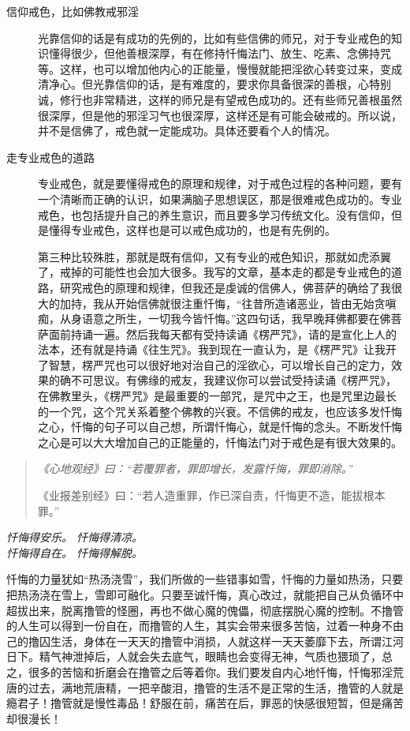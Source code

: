 \documentclass{ctexart}
\begin{document}
\begin{description}
    \item[信仰戒色，比如佛教戒邪淫] 光靠信仰的话是有成功的先例的，比如有些信佛的师兄，对于专业戒色的知识懂得很少，但他善根深厚，有在修持忏悔法门、放生、吃素、念佛持咒等。这样，也可以增加他内心的正能量，慢慢就能把淫欲心转变过来，变成清净心。但光靠信仰的话，是有难度的，要求你具备很深的善根，心特别诚，修行也非常精进，这样的师兄是有望戒色成功的。还有些师兄善根虽然很深厚，但是他的邪淫习气也很深厚，这样还是有可能会破戒的。所以说，并不是信佛了，戒色就一定能成功。具体还要看个人的情况。
    \item[走专业戒色的道路] 专业戒色，就是要懂得戒色的原理和规律，对于戒色过程的各种问题，要有一个清晰而正确的认识，如果满脑子思想误区，那是很难戒色成功的。专业戒色，也包括提升自己的养生意识，而且要多学习传统文化。没有信仰，但是懂得专业戒色，这样也是可以戒色成功的，也是有先例的。
    \item[] 第三种比较殊胜，那就是既有信仰，又有专业的戒色知识，那就如虎添翼了，戒掉的可能性也会加大很多。我写的文章，基本走的都是专业戒色的道路，研究戒色的原理和规律，但我还是虔诚的信佛人，佛菩萨的确给了我很大的加持，我从开始信佛就很注重忏悔，“往昔所造诸恶业，皆由无始贪嗔痴，从身语意之所生，一切我今皆忏悔。”这四句话，我早晚拜佛都要在佛菩萨面前持诵一遍。然后我每天都有受持读诵《楞严咒》，请的是宣化上人的法本，还有就是持诵《往生咒》。我到现在一直认为，是《楞严咒》让我开了智慧，楞严咒也可以很好地对治自己的淫欲心，可以增长自己的定力，效果的确不可思议。有佛缘的戒友，我建议你可以尝试受持读诵《楞严咒》，在佛教里头，《楞严咒》是最重要的一部咒，是咒中之王，也是咒里边最长的一个咒，这个咒关系着整个佛教的兴衰。不信佛的戒友，也应该多发忏悔之心，忏悔的句子可以自己想，所谓忏悔心，就是忏悔的念头。不断发忏悔之心是可以大大增加自己的正能量的，忏悔法门对于戒色是有很大效果的。
\end{description}

\begin{quotation}\it
    《心地观经》曰：“若覆罪者，罪即增长，发露忏悔，罪即消除。”

    《业报差别经》曰：“若人造重罪，作已深自责，忏悔更不造，能拔根本罪。”
\end{quotation}

\begin{center}\it
    忏悔得安乐。    忏悔得清凉。\\
    忏悔得自在。    忏悔得解脱。
\end{center}

忏悔的力量犹如“热汤浇雪”，我们所做的一些错事如雪，忏悔的力量如热汤，只要把热汤浇在雪上，雪即可融化。只要至诚忏悔，真心改过，就能把自己从负循环中超拔出来，脱离撸管的怪圈，再也不做心魔的傀儡，彻底摆脱心魔的控制。不撸管的人生可以得到一份自在，而撸管的人生，其实会带来很多苦恼，过着一种身不由己的撸囚生活，身体在一天天的撸管中消损，人就这样一天天萎靡下去，所谓江河日下。精气神泄掉后，人就会失去底气，眼睛也会变得无神，气质也猥琐了，总之，很多的苦恼和折磨会在撸管之后等着你。我们要发自内心地忏悔，忏悔邪淫荒唐的过去，满地荒唐精，一把辛酸泪，撸管的生活不是正常的生活，撸管的人就是瘾君子！撸管就是慢性毒品！舒服在前，痛苦在后，罪恶的快感很短暂，但是痛苦却很漫长！
\end{document}
